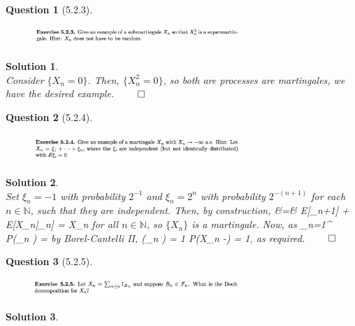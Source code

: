 \documentclass[11pt]{article}
\theoremstyle{plain}
\def\eQb#1\eQe{\begin{eqnarray*}#1\end{eqnarray*}}
\theoremstyle{quest}
\newtheorem*{question}{Question}
\newtheorem*{solution}{Solution}
\begin{document}
\newpage

\begin{question}[5.2.3]
\hfill
\begin{figure}[h!]
  \centering
    \includegraphics[width=0.7\textwidth]{d-5-2-3.png}
\end{figure}
\end{question}
\begin{solution} \hfill \\
Consider $\{X_n = 0\}$. Then, $\{X_n^2 = 0\}$, so both are processes are martingales, 
we have the desired example. \hfill $\qed$
\end{solution}

\newpage

\begin{question}[5.2.4]
\hfill
\begin{figure}[h!]
  \centering
    \includegraphics[width=0.7\textwidth]{d-5-2-4.png}
\end{figure}
\end{question}
\begin{solution} \hfill \\
Set $\xi_n = -1$ with probability $2^{-1}$ and $\xi_n = 2^{n}$ with probability
$2^{-(n+1)}$ 
for each $n \in \mathbb{N}$, such that they are independent. Then, by construction, 
\eQb
E[X_{n+1}| \mathscr{F}_n] &=& E[\xi_{n+1}] + E[X_n|_n] = X_n
\eQe
for all $n \in \mathbb{N}$, so $\{X_n\}$ is a martingale. Now, as
\eQb
\sum_{n=1}^{\infty} P(\xi_n ) = \infty
\eQe
by Borel-Cantelli II,
\eQb
P(\xi_n  \>\>\>  ) = 1 \>\>\>  \>\>\> P(X_n \to -\infty) = 1,
\eQe
as required. \hfill $\qed$
\end{solution}

\newpage

\begin{question}[5.2.5]
\hfill
\begin{figure}[h!]
  \centering
    \includegraphics[width=0.7\textwidth]{d-5-2-5.png}
\end{figure}
\end{question}
\begin{solution} \hfill \\
\end{solution}
\end{document}

